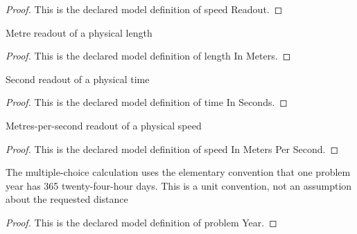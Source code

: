 \begin{proof}
  This is the declared model definition of speed Readout.
\end{proof}
\begin{definition}
  \label{def:physics:phyx-mini-0632:phyxminiproblems-problemphyxmini0632-lengthinmeters}
  Metre readout of a physical length
\end{definition}
\begin{proof}
  This is the declared model definition of length In Meters.
\end{proof}
\begin{definition}
  \label{def:physics:phyx-mini-0632:phyxminiproblems-problemphyxmini0632-timeinseconds}
  Second readout of a physical time
\end{definition}
\begin{proof}
  This is the declared model definition of time In Seconds.
\end{proof}
\begin{definition}
  \label{def:physics:phyx-mini-0632:phyxminiproblems-problemphyxmini0632-speedinmeterspersecond}
  Metres-per-second readout of a physical speed
\end{definition}
\begin{proof}
  This is the declared model definition of speed In Meters Per Second.
\end{proof}
\begin{definition}
  \label{def:physics:phyx-mini-0632:phyxminiproblems-problemphyxmini0632-problemyear}
  The multiple-choice calculation uses the elementary convention that one problem year has 365 twenty-four-hour days. This is a unit convention, not an assumption about the requested distance
\end{definition}
\begin{proof}
  This is the declared model definition of problem Year.
\end{proof}
